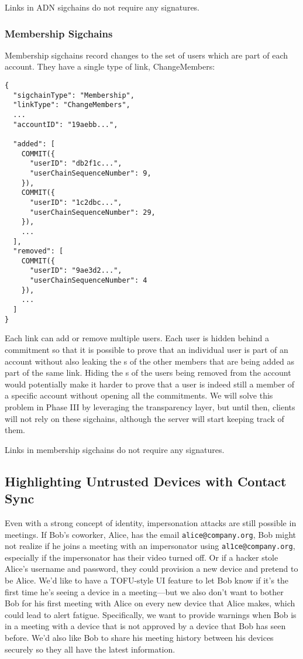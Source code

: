 Links in ADN sigchains do not require any signatures.

\subsubsection{Membership Sigchains}

Membership sigchains record changes to the set of users which are part of each account. They
have a single type of link, \textsf{ChangeMembers}:

\begingroup{}
\fontsize{10pt}{12pt}\selectfont{}
\begin{verbatim}
{
  "sigchainType": "Membership",
  "linkType": "ChangeMembers",
  ...
  "accountID": "19aebb...",

  "added": [
    COMMIT({
      "userID": "db2f1c...",
      "userChainSequenceNumber": 9,
    }),
    COMMIT({
      "userID": "1c2dbc...",
      "userChainSequenceNumber": 29,
    }),
    ...
  ],
  "removed": [
    COMMIT({
      "userID": "9ae3d2...",
      "userChainSequenceNumber": 4
    }),
    ...
  ]
}
\end{verbatim}
\endgroup{}
Each link can add or remove multiple users. Each user is hidden behind a commitment so that it is
possible to prove that an individual user is part of an account without also leaking the {\userID}s
of the other members that are being added as part of the same link. Hiding the {\userID}s of the
users being removed from the account would potentially make it harder to prove that a user is indeed
still a member of a specific account without opening all the commitments. We will solve this problem
in Phase III by leveraging the transparency layer, but until then, clients will not rely on
these sigchains, although the server will start keeping track of them.

Links in membership sigchains do not require any signatures.

\subsection{Highlighting Untrusted Devices with Contact Sync}
\label{subsec:contactsync}

Even with a strong concept of identity, impersonation attacks are still possible in meetings. If
Bob's coworker, Alice, has the email \texttt{alice@company.org}, Bob might not realize if he joins a
meeting with an impersonator using \texttt{al1ce@company.org}, especially if the impersonator has
their video turned off. Or if a hacker stole Alice's username and password, they could provision a
new device and pretend to be Alice. We'd like to have a TOFU-style UI feature to let Bob know if
it's the first time he's seeing a device in a meeting---but we also don't want to bother Bob for his
first meeting with Alice on every new device that Alice makes, which could lead to alert fatigue.
Specifically, we want to provide warnings when Bob is in a meeting with a device that is not
approved by a device that Bob has seen before. We'd also like Bob to share his meeting history
between his devices securely so they all have the latest information.

